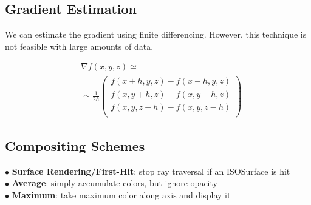\subsection{Gradient Estimation}
We can estimate the gradient using finite differencing. However, this technique is not feasible with large amounts of data.

\begin{align*}
    & \nabla f(x, y, z) \simeq \\
    & \simeq \frac{1}{2h} \begin{pmatrix}
        f(x + h, y, z) - f(x - h, y, z) \\
        f(x, y + h, z) - f(x, y - h, z) \\
        f(x, y, z + h) - f(x, y, z - h) \\
    \end{pmatrix}
\end{align*}

\subsection{Compositing Schemes}
$\bullet$ \textbf{Surface Rendering/First-Hit}: stop ray traversal if an ISOSurface is hit \\
$\bullet$ \textbf{Average}: simply accumulate colors, but ignore opacity \\
$\bullet$ \textbf{Maximum}: take maximum color along axis and display it